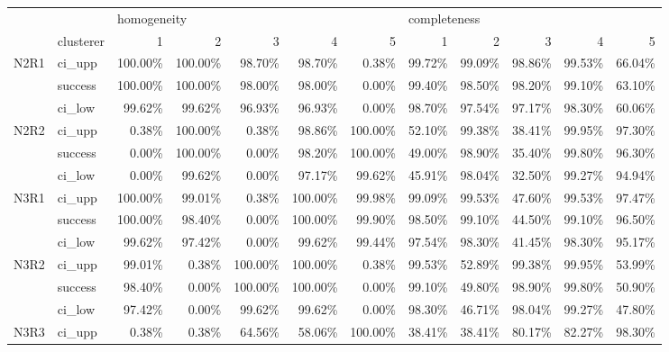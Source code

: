 \begin{tabular}{llrrrrrrrrrr}
\toprule
     & {} & \multicolumn{5}{l}{homogeneity} & \multicolumn{5}{l}{completeness} \\
     & clusterer &           1 &       2 &       3 &       4 &       5 &            1 &      2 &      3 &      4 &      5 \\
\midrule
N2R1 & ci\_upp &     100.00\% & 100.00\% &  98.70\% &  98.70\% &   0.38\% &       99.72\% & 99.09\% & 98.86\% & 99.53\% & 66.04\% \\
     & success &     100.00\% & 100.00\% &  98.00\% &  98.00\% &   0.00\% &       99.40\% & 98.50\% & 98.20\% & 99.10\% & 63.10\% \\
     & ci\_low &      99.62\% &  99.62\% &  96.93\% &  96.93\% &   0.00\% &       98.70\% & 97.54\% & 97.17\% & 98.30\% & 60.06\% \\
N2R2 & ci\_upp &       0.38\% & 100.00\% &   0.38\% &  98.86\% & 100.00\% &       52.10\% & 99.38\% & 38.41\% & 99.95\% & 97.30\% \\
     & success &       0.00\% & 100.00\% &   0.00\% &  98.20\% & 100.00\% &       49.00\% & 98.90\% & 35.40\% & 99.80\% & 96.30\% \\
     & ci\_low &       0.00\% &  99.62\% &   0.00\% &  97.17\% &  99.62\% &       45.91\% & 98.04\% & 32.50\% & 99.27\% & 94.94\% \\
N3R1 & ci\_upp &     100.00\% &  99.01\% &   0.38\% & 100.00\% &  99.98\% &       99.09\% & 99.53\% & 47.60\% & 99.53\% & 97.47\% \\
     & success &     100.00\% &  98.40\% &   0.00\% & 100.00\% &  99.90\% &       98.50\% & 99.10\% & 44.50\% & 99.10\% & 96.50\% \\
     & ci\_low &      99.62\% &  97.42\% &   0.00\% &  99.62\% &  99.44\% &       97.54\% & 98.30\% & 41.45\% & 98.30\% & 95.17\% \\
N3R2 & ci\_upp &      99.01\% &   0.38\% & 100.00\% & 100.00\% &   0.38\% &       99.53\% & 52.89\% & 99.38\% & 99.95\% & 53.99\% \\
     & success &      98.40\% &   0.00\% & 100.00\% & 100.00\% &   0.00\% &       99.10\% & 49.80\% & 98.90\% & 99.80\% & 50.90\% \\
     & ci\_low &      97.42\% &   0.00\% &  99.62\% &  99.62\% &   0.00\% &       98.30\% & 46.71\% & 98.04\% & 99.27\% & 47.80\% \\
N3R3 & ci\_upp &       0.38\% &   0.38\% &  64.56\% &  58.06\% & 100.00\% &       38.41\% & 38.41\% & 80.17\% & 82.27\% & 98.30\% \\

\end{tabular}
